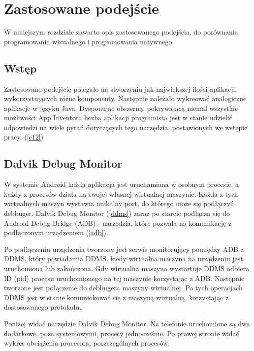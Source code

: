 \chapter{Zastosowane podejście}
\label{c4}

W niniejszym rozdziale zawarto opis zastosowanego podejścia, do porównania programowania wizualnego i programowania natywnego.

\section{Wstęp}
\label{c41}

Zastosowane podejście polegało na stworzeniu jak największej ilości aplikacji, wykorzystujących różne komponenty. Następnie należało wykreować analogiczne aplikacje w języku Java. Dysponując obszerną, pokrywającą niemal wszystkie możliwości App Inventora  liczbą aplikacji programista jest w stanie udzielić odpowiedzi na wiele pytań dotyczących tego narzędzia, postawionych we wstępie pracy. (\ref{c12})

\section{Dalvik Debug Monitor}

W systemie Android każda aplikacja jest uruchamiana w osobnym procesie, a każdy z procesów działa na swojej własnej wirtualnej maszynie. Każda z tych wirtualnych maszyn wystawia unikalny port, do którego może się podłączyć debbuger. Dalvik Debug Monitor (\ref{ddms}) zaraz po starcie podłącza się do Android Debug Bridge (ADB) - narzędzia, które pozwala na komunikację z podłączonym urządzeniem (\ref{adb}).

Po podłączeniu urządzenia tworzony jest serwis monitorujący pomiędzy ADB a DDMS, który powiadamia DDMS, kiedy wirtualna maszyna na urządzeniu jest uruchomiona lub zakończona. Gdy wirtualna maszyna wystartuje DDMS odbiera ID (pid) procesu uruchomionego na tej maszynie korzystając z ADB. Następnie tworzone jest połączenie do debbugera maszyny wirtualnej. Po tych operacjach DDMS jest w stanie komuniokować się z maszyną wirtualną, korzystając z dostosowanego protokołu.\cite{doc:ddms}

Poniżej widać narzędzie Dalvik Debug Monitor. Na telefonie uruchomione są dwa dodatkowe, poza systemowymi, procesy jednocześnie. Po prawej stronie widać wykres obciążenia procesora, poszczególnych procesów.


